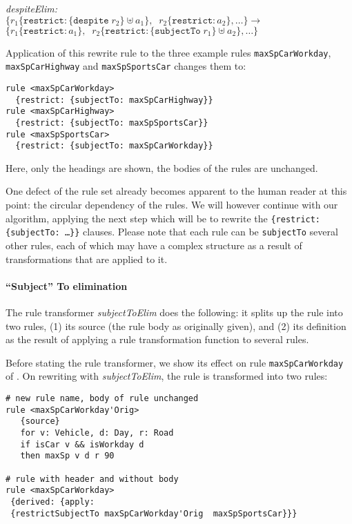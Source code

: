 \noindent
\emph{despiteElim:}\\
$
\{r_1 \{\mathtt{restrict}: \{\mathtt{despite}\; r_2\} \uplus a_1\},\;\;
r_2\{\mathtt{restrict}: a_2\}, \dots\} \longrightarrow$\\
$\{r_1 \{\mathtt{restrict}: a_1\},\;\;
r_2\{\mathtt{restrict}:  \{\mathtt{subjectTo}\; r_1\} \uplus a_2\}, \dots\}
$

\begin{example}\label{ex:rewrite_despite}
Application of this rewrite rule to the three example rules \texttt{maxSpCarWorkday},
\texttt{maxSpCarHighway} and  \texttt{maxSpSportsCar} changes them to:

\begin{lstlisting}
rule <maxSpCarWorkday>
  {restrict: {subjectTo: maxSpCarHighway}}
rule <maxSpCarHighway>
  {restrict: {subjectTo: maxSpSportsCar}}
rule <maxSpSportsCar>
  {restrict: {subjectTo: maxSpCarWorkday}}
\end{lstlisting}
Here, only the headings are shown, the bodies of the rules are
unchanged. 
\end{example}

One defect of the rule set already becomes apparent to the human reader at
this point: the circular dependency of the rules. We will however continue
with our algorithm, applying the next step which will be to rewrite the
\texttt{\{restrict: \{subjectTo: \dots\}\}} clauses.  Please note that each
rule can be \texttt{subjectTo} several other rules, each of which may have a
complex structure as a result of transformations that are applied to it.


\paragraph{\textbf{``Subject'' To elimination}}

The rule transformer \emph{subjectToElim} does the following: it splits up the
rule into two rules, (1) its source (the rule body as originally given), and
(2) its definition as the result of applying a rule transformation function to
several rules.

\begin{example}\label{ex:rewrite_subject_to}
Before stating the rule transformer, we show its effect on rule
\texttt{maxSpCarWorkday} of . On rewriting
with \emph{subjectToElim}, the rule is transformed into two rules:

\begin{lstlisting}
# new rule name, body of rule unchanged
rule <maxSpCarWorkday'Orig>
   {source}
   for v: Vehicle, d: Day, r: Road
   if isCar v && isWorkday d
   then maxSp v d r 90

# rule with header and without body
rule <maxSpCarWorkday>
 {derived: {apply: 
 {restrictSubjectTo maxSpCarWorkday'Orig  maxSpSportsCar}}}
\end{lstlisting}
\end{example}

